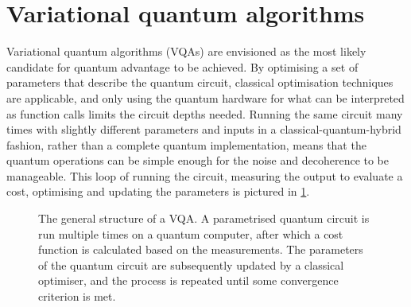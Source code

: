 \section{Variational quantum algorithms}
\label{sec:vqa}
Variational quantum algorithms (VQAs) are envisioned as the most likely candidate for quantum advantage to be achieved.
By optimising a set of parameters that describe the quantum circuit, classical optimisation techniques are applicable, and only using the quantum hardware for what can be interpreted as function calls limits the circuit depths needed.
Running the same circuit many times with slightly different parameters and inputs in a classical-quantum-hybrid fashion, rather than a complete quantum implementation, means that the quantum operations can be simple enough for the noise and decoherence to be manageable.
This loop of running the circuit, measuring the output to evaluate a cost, optimising and updating the parameters is pictured in \cref{fig:vqa}.

\begin{figure}
    \centering
    \caption{
        The general structure of a VQA.
        A parametrised quantum circuit is run multiple times on a quantum computer, after which a cost function is calculated based on the measurements.
        The parameters of the quantum circuit are subsequently updated by a classical optimiser, and the process is repeated until some convergence criterion is met.
    }
    \label{fig:vqa}
\end{figure}

